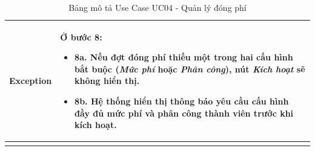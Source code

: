 \begin{longtable}{|m{}|m{}|}
\textbf{Exception} 
& Ở bước 8:
\begin{itemize}
    \item \textbf{8a.} Nếu đợt đóng phí thiếu một trong hai cấu hình bắt buộc (\textit{Mức phí} hoặc \textit{Phân công}), nút \textit{Kích hoạt} sẽ không hiển thị.
    \item \textbf{8b.} Hệ thống hiển thị thông báo yêu cầu cấu hình đầy đủ mức phí và phân công thành viên trước khi kích hoạt.
\end{itemize}
\\ \hline
\caption{Bảng mô tả Use Case UC04 - Quản lý đóng phí}
\end{longtable}

